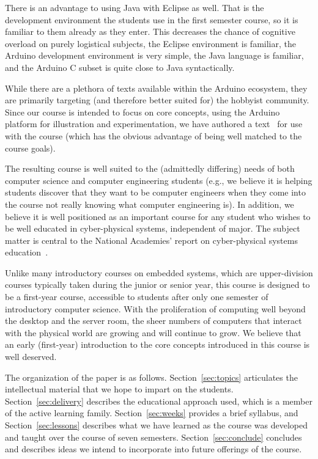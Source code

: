 There is an advantage to using Java with Eclipse as well. That is the
development environment the students use in the first semester course, so
it is familiar to them already as they enter.  This decreases the chance
of cognitive overload on purely logistical subjects, the Eclipse environment
is familiar, the Arduino development environment is very simple, the
Java language is familiar, and the Arduino C subset is quite close to
Java syntactically.

While there are a plethora of texts available within the Arduino
ecosystem, they are primarily targeting (and therefore better suited for)
the hobbyist community. Since
our course is intended to focus on core concepts, using the
Arduino platform for illustration and experimentation, we have authored
a text~\cite{cc17} for use with the course (which has the obvious
advantage of being well matched to the course goals).

The resulting course is well suited to the (admittedly differing) needs of
both computer science and computer
engineering students (e.g., we believe it is helping students discover
that they want to be computer engineers when they come into the course
not really knowing what computer engineering is).
In addition, we believe it is well positioned as an important course for
any student who wishes to be well educated in cyber-physical systems,
independent of major.
The subject matter is central to the National Academies' report on
cyber-physical systems education~\cite{nasem16}.

Unlike many introductory courses on embedded systems, which are upper-division
courses typically taken during the junior or senior year, this course is
designed to be a first-year course, accessible to students after only
one semester of introductory computer science.  With the proliferation of
computing well beyond the desktop and the server room, the sheer numbers
of computers that interact with the physical world are growing and
will continue to grow.
We believe that an early (first-year) introduction to the core concepts
introduced in this course is well deserved.

The organization of the paper is as follows.  Section~\ref{sec:topics}
articulates the intellectual material that we hope to impart on the
students.  
Section~\ref{sec:delivery} describes the educational approach used,
which is a member of the active learning family.
Section~\ref{sec:weeks} provides a brief syllabus, and
Section~\ref{sec:lessons} describes what we have learned as the course
was developed and taught over the course of seven semesters.
Section~\ref{sec:conclude} concludes and describes ideas we intend
to incorporate into future offerings of the course.
